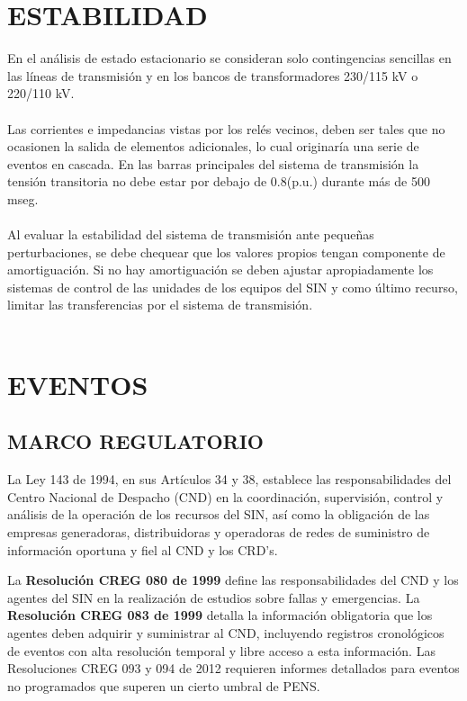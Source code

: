 \documentclass[a5paper]{book}%
\begin{document}
\chapter{ESTABILIDAD}
 En el análisis de estado estacionario se consideran solo
  contingencias sencillas en las líneas de transmisión y en los bancos
  de transformadores 230/115 kV o 220/110 kV.\\\\
	
	
 Las corrientes e impedancias vistas por los relés vecinos, deben
  ser tales que no ocasionen la salida de elementos adicionales, lo
  cual originaría una serie de eventos en cascada.  En las barras
  principales del sistema de transmisión la tensión transitoria no
  debe estar por debajo de 0.8(p.u.) durante más de 500 mseg.\\\\
	
 Al evaluar la estabilidad del sistema de transmisión ante
  pequeñas perturbaciones, se debe chequear que los valores propios
  tengan componente de amortiguación. Si no hay amortiguación se deben
  ajustar apropiadamente los sistemas de control de las unidades de
  los equipos del SIN y como último recurso, limitar las
  transferencias por el sistema de transmisión.\\\\


  \chapter{EVENTOS}

  \section{MARCO REGULATORIO}

\begin{center}
\begin{tcolorbox}
La Ley 143 de 1994, en sus Artículos 34 y 38, establece las responsabilidades del Centro Nacional de Despacho (CND) en la coordinación, supervisión, control y análisis de la operación de los recursos del SIN, así como la obligación de las empresas generadoras, distribuidoras y operadoras de redes de suministro de información oportuna y fiel al CND y los CRD's.
\end{tcolorbox}
\end{center}

  La \textbf{Resolución CREG 080 de 1999} define las responsabilidades del CND y los agentes del SIN en la realización de estudios sobre fallas y emergencias. La \textbf{Resolución CREG 083 de 1999} detalla la información obligatoria que los agentes deben adquirir y suministrar al CND, incluyendo registros cronológicos de eventos con alta resolución temporal y libre acceso a esta información. Las Resoluciones CREG 093 y 094 de 2012 requieren informes detallados para eventos no programados que superen un cierto umbral de \ac{PENS}.\\\\
\end{document}

